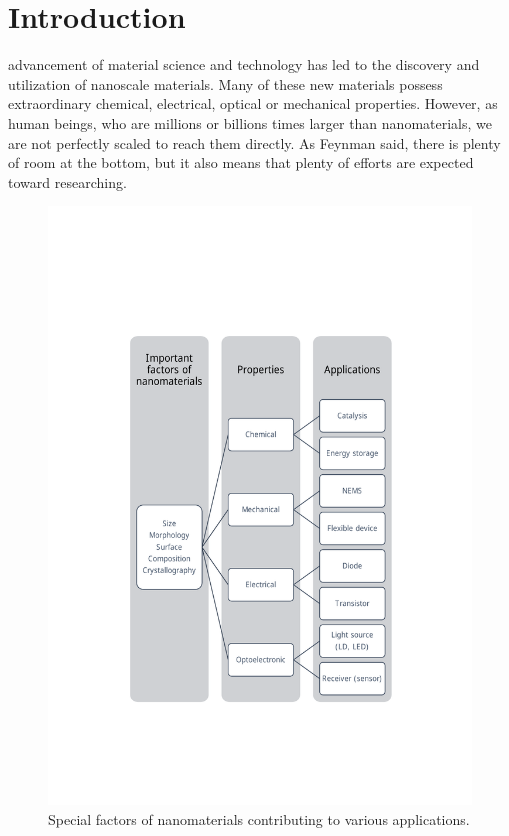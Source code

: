 

\chapter{Introduction}

 advancement of material science and technology has led to the discovery and utilization of nanoscale materials. Many of these new materials possess extraordinary chemical, electrical, optical or mechanical properties. However, as human beings, who are millions or billions times larger than nanomaterials, we are not perfectly scaled to reach them directly. As Feynman said, there is plenty of room at the bottom, but it also means that plenty of efforts are expected toward researching. 

\begin{figure} 
\centering
\includegraphics[width=400pt]{figures/figure1_factors}
\caption[Factors and applications]{Special factors of nanomaterials contributing to various applications. 
\label{fig:1_factor}}
\end{figure}


